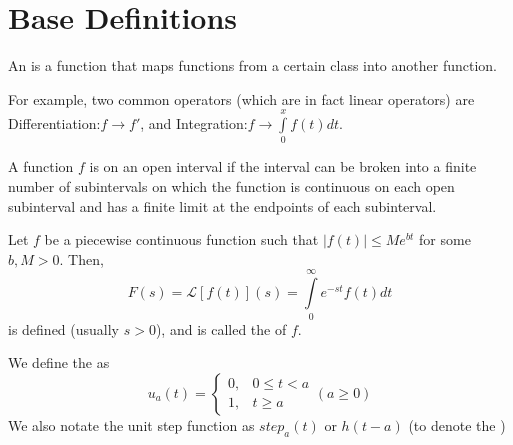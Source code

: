 \documentclass[12pt, a4paper, oneside, openright, titlepage]{book}
\begin{document}
\section{Base Definitions}

\begin{defn}[Operator]
        An  is a function that maps functions from a certain class into another function.
\end{defn}
\begin{eg}
        For example, two common operators (which are in fact linear operators) are Differentiation:$f\rightarrow f'$, and Integration:$f\rightarrow \int\limits_{0}^xf(t)dt$.
\end{eg}




\begin{defn}
        A function $f$ is  on an open interval if the interval can be broken into a finite number of subintervals on which the function is continuous on each open subinterval and has a finite limit at the endpoints of each subinterval.
\end{defn}



\begin{defn}
        Let $f$ be a piecewise continuous function such that $|f(t)| \leq Me^{bt}$ for some $b,M > 0$. Then, \begin{equation}
                F(s) = \mathcal{L}[f(t)](s) = \int\limits_{0}^{\infty}e^{-st}f(t)dt
        \end{equation} 
        is defined (usually $s > 0$), and is called the  of $f$.
\end{defn}




\begin{defn}
        We define the  as \begin{equation}
                u_a(t) = \left\{\begin{array}{cc} 0, & 0\leq t < a \\ 1, & t \geq a \end{array}\right. (a \geq 0)
        \end{equation}
        We also notate the unit step function as $step_a(t)$ or $h(t-a)$ (to denote the )
\end{defn}

\end{document}
